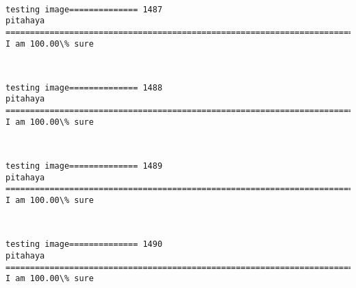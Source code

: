 \documentclass[11pt]{article}
\begin{document}
    \begin{center}
    \end{center}
    { \hspace*{\fill} \\}
    
    \begin{Verbatim}[commandchars=\\\{\}]
testing image============== 1487
pitahaya
============================================================================
I am 100.00\% sure

    \end{Verbatim}

    \begin{center}
    \end{center}
    { \hspace*{\fill} \\}
    
    \begin{Verbatim}[commandchars=\\\{\}]
testing image============== 1488
pitahaya
============================================================================
I am 100.00\% sure

    \end{Verbatim}

    \begin{center}
    \end{center}
    { \hspace*{\fill} \\}
    
    \begin{Verbatim}[commandchars=\\\{\}]
testing image============== 1489
pitahaya
============================================================================
I am 100.00\% sure

    \end{Verbatim}

    \begin{center}
    \end{center}
    { \hspace*{\fill} \\}
    
    \begin{Verbatim}[commandchars=\\\{\}]
testing image============== 1490
pitahaya
============================================================================
I am 100.00\% sure

    \end{Verbatim}
\end{document}
